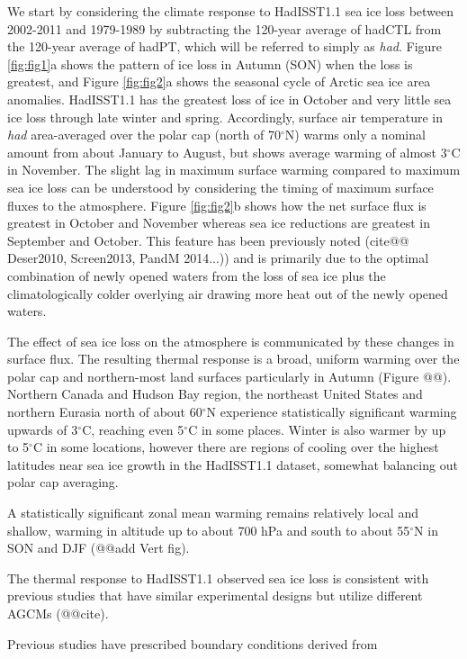 \documentclass[twocol]{ametsoc}
\begin{document}
We start by considering the climate response to HadISST1.1 sea ice loss between 2002-2011 and 1979-1989 by subtracting the 120-year average of hadCTL from the 120-year average of hadPT, which will be referred to simply as \textit{had}. Figure \ref{fig:fig1}a shows the pattern of ice loss in Autumn (SON) when the loss is greatest, and Figure \ref{fig:fig2}a shows the seasonal cycle of Arctic sea ice area anomalies. HadISST1.1 has the greatest loss of ice in October and very little sea ice loss through late winter and spring. Accordingly, surface air temperature in \textit{had} area-averaged over the polar cap (north of 70$^\circ$N) warms only a nominal amount from about January to August, but shows average warming of almost 3$^\circ$C in November. The slight lag in maximum surface warming compared to maximum sea ice loss can be understood by considering the timing of maximum surface fluxes to the atmosphere. Figure \ref{fig:fig2}b shows how the net surface flux is greatest in October and November whereas sea ice reductions are greatest in September and October. This feature has been previously noted (cite@@ Deser2010, Screen2013, PandM 2014...)) and is primarily due to the optimal combination of newly opened waters from the loss of sea ice plus the climatologically colder overlying air drawing more heat out of the newly opened waters. 

The effect of sea ice loss on the atmosphere is communicated by these changes in surface flux. The resulting thermal response is a broad, uniform warming over the polar cap and northern-most land surfaces particularly in Autumn (Figure @@). Northern Canada and Hudson Bay region, the northeast United States and northern Eurasia north of about 60$^\circ$N experience statistically significant warming upwards of 3$^\circ$C, reaching even 5$^\circ$C in some places. Winter is also warmer by up to 5$^\circ$C in some locations, however there are regions of cooling over the highest latitudes near sea ice growth in the HadISST1.1 dataset, somewhat balancing out polar cap averaging.

 A statistically significant zonal mean warming remains relatively local and shallow, warming in altitude up to about 700 hPa and south to about 55$^\circ$N in SON and DJF (@@add Vert fig).

The thermal response to HadISST1.1 observed sea ice loss is consistent with previous studies that have similar experimental designs but utilize different AGCMs (@@cite).

Previous studies have prescribed boundary conditions derived from
\end{document}
